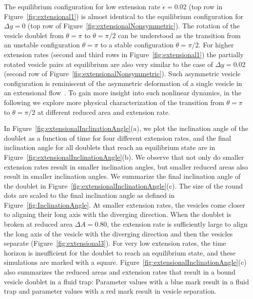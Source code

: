 \documentclass[prf,superscriptaddress,showkeys,longbibliography]{revtex4-1}
\begin{document}
The equilibrium configuration for low extension rate $\dot\epsilon=0.02$
(top row in Figure~\ref{fig:extensional1}) is almost identical to the
equilibrium configuration for $\Delta y=0$ (top row of
Figure~\ref{fig:extensionalNonsymmetric}).  The rotation of the vesicle
doublet from $\theta=\pi$ to $\theta=\pi/2$ can be understood as the
transition from an unstable configuration $\theta=\pi$ to a stable
configuration $\theta=\pi/2$.  For higher extension rates (second and
third rows in Figure~\ref{fig:extensional1}) the partially rotated
vesicle pairs at equilibrium are also very similar to the case of
$\Delta y=0.02$ (second row of
Figure~\ref{fig:extensionalNonsymmetric}).  Such asymmetric vesicle
configuration is reminiscent of the asymmetric deformation of a single
vesicle in an extensional flow~\cite{KantslerSegreSteinberg2008_PRL,Narsimhan2014_JFM,DahlNarsimhanGouveia2016_SoftMatt}.
To gain more insight into such nonlinear dynamics, in the following we
explore more physical characterization of the transition from
$\theta=\pi$ to $\theta=\pi/2$ at different reduced area and extension
rate.

In Figure~\ref{fig:extensionalInclinationAngle}(a), we plot the
inclination angle of the doublet as a function of time for four
different extension rates, and the final inclination angle for all
doublets that reach an equilibrium state are in
Figure~\ref{fig:extensionalInclinationAngle}(b).  We observe that not
only do smaller extension rates result in smaller inclination angles,
but smaller reduced areas also result in smaller inclination angles.  We
summarize the final inclination angle of the doublet in
Figure~\ref{fig:extensionalInclinationAngle}(c).  The size of the round
dots are scaled to the final inclination angle as defined in
Figure~\ref{fig:InclinationAngle}.  At smaller extension rates, the
vesicles come closer to aligning their long axis with the diverging
direction.  When the doublet is broken at reduced area $\Delta A =
0.80$, the extension rate is sufficiently large to align the long axis
of the vesicle with the diverging direction and then the vesicles
separate (Figure~\ref{fig:extensional3}).  For very low extension rates,
the time horizon is insufficient for the doublet to reach an equilibrium
state, and these simulations are marked with a square.
Figure~\ref{fig:extensionalInclinationAngle}(c) also summarizes the
reduced areas and extension rates that result in a bound vesicle doublet
in a fluid trap: Parameter values with a blue mark result in a fluid
trap and parameter values with a red mark result in vesicle separation.
\end{document}
